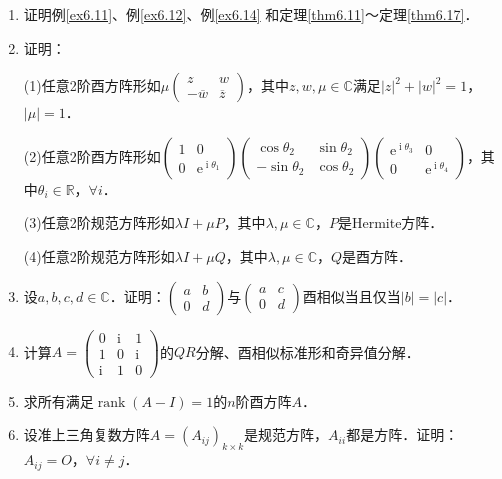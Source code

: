 \documentclass[a4paper,fontset=windows]{ctexbook}
\theoremstyle{definition}
\DeclareMathOperator{\E}{e}
\DeclareMathOperator{\I}{i}
\DeclareMathOperator{\rank}{rank}
\begin{document}
\begin{enumerate}
\item 证明例\ref{ex6.11}、例\ref{ex6.12}、例\ref{ex6.14} 和定理\ref{thm6.11}～定理\ref{thm6.17}．

\item 证明：

(1)任意2阶酉方阵形如$\mu\begin{pmatrix}z&w \\ -\overline{w}&\overline{z}\end{pmatrix}$，其中$z,w,\mu\in\mathbb{C}$满足$|z|^2+|w|^2=1$，$|\mu|=1$．

(2)任意2阶酉方阵形如$\begin{pmatrix}1&0 \\ 0&\E^{\I\theta_1}\end{pmatrix}\begin{pmatrix}\cos\theta_2&\sin\theta_2 \\ -\sin\theta_2&\cos\theta_2\end{pmatrix}\begin{pmatrix}\E^{\I\theta_3}&0 \\ 0&\E^{\I\theta_4}\end{pmatrix}$，其中$\theta_i\in\mathbb{R}$，$\forall i$．

(3)任意2阶规范方阵形如$\lambda I+\mu P$，其中$\lambda,\mu\in\mathbb{C}$，$P$是Hermite方阵．

(4)任意2阶规范方阵形如$\lambda I+\mu Q$，其中$\lambda,\mu\in\mathbb{C}$，$Q$是酉方阵．

\item 设$a,b,c,d\in\mathbb{C}$．证明：$\begin{pmatrix}a&b \\ 0&d\end{pmatrix}$与$\begin{pmatrix}a&c \\ 0&d\end{pmatrix}$酉相似当且仅当$|b|=|c|$．

\item 计算$A=\begin{pmatrix}0&\I&1 \\ 1&0&\I \\ \I&1&0\end{pmatrix}$的$QR$分解、酉相似标准形和奇异值分解．

\item 求所有满足$\rank(A-I)=1$的$n$阶酉方阵$A$．

\item 设准上三角复数方阵$A=(A_{ij})_{k\times k}$是规范方阵，$A_{ii}$都是方阵．证明：$A_{ij}=O$，$\forall i\ne j$．


\end{enumerate}
\end{document}
